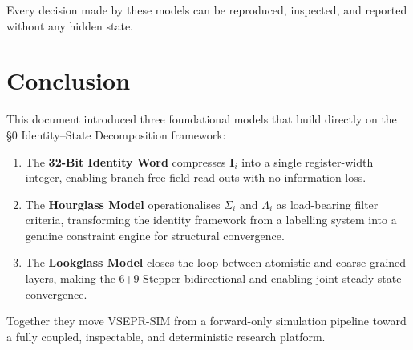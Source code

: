 \documentclass[11pt, a4paper, oneside]{article}
\theoremstyle{definition}
\newcommand{\boldI}{\bm{I}}
\begin{document}
Every decision made by these models can be reproduced, inspected, and
reported without any hidden state.

\section*{Conclusion}

This document introduced three foundational models that build directly
on the §0 Identity–State Decomposition framework:

\begin{enumerate}
  \item The \textbf{32-Bit Identity Word} compresses $\boldI_i$ into a
        single register-width integer, enabling branch-free field read-outs
        with no information loss.

  \item The \textbf{Hourglass Model} operationalises $\Sigma_i$ and
        $\Lambda_i$ as load-bearing filter criteria, transforming the
        identity framework from a labelling system into a genuine
        constraint engine for structural convergence.

  \item The \textbf{Lookglass Model} closes the loop between atomistic
        and coarse-grained layers, making the 6+9 Stepper bidirectional
        and enabling joint steady-state convergence.

\end{enumerate}

Together they move VSEPR-SIM from a forward-only simulation pipeline
toward a fully coupled, inspectable, and deterministic research platform.
\end{document}
